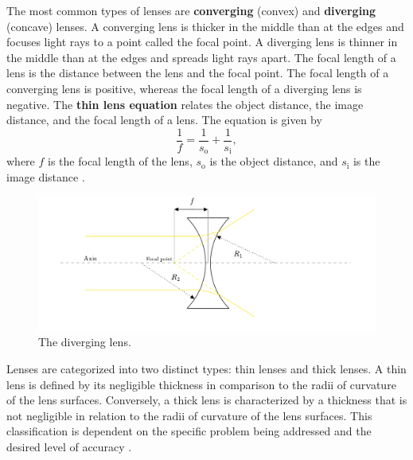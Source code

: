 \documentclass[10pt]{article}
\begin{document}
The most common types of lenses are \textbf{converging} (convex) and \textbf{diverging} (concave) lenses. A converging lens is thicker in the middle than at the edges and focuses light rays to a point called the focal point. A diverging lens is thinner in the middle than at the edges and spreads light rays apart. The focal length of a lens is the distance between the lens and the focal point. The focal length of a converging lens is positive, whereas the focal length of a diverging lens is negative. The \textbf{thin lens equation} relates the object distance, the image distance, and the focal length of a lens. The equation is given by
\begin{equation}
  \label{eq:1}
  \frac{1}{f} = \frac{1}{s_{\text{o}}} + \frac{1}{s_{\text{i}}},
\end{equation}
where $f$ is the focal length of the lens, $s_{\text{o}}$ is the object distance, and $s_{\text{i}}$ is the image distance \cite{Pedrotti_2006}.  

\begin{figure}[hbt!]
  \centering
  \includegraphics[scale=0.5]{figures/f2.pdf}
  \caption{The diverging lens.}
  \label{fig:2}
\end{figure}

Lenses are categorized into two distinct types: thin lenses and thick lenses. A thin lens is defined by its negligible thickness in comparison to the radii of curvature of the lens surfaces. Conversely, a thick lens is characterized by a thickness that is not negligible in relation to the radii of curvature of the lens surfaces. This classification is dependent on the specific problem being addressed and the desired level of accuracy \cite{Hecht_2017}. 
\end{document}
